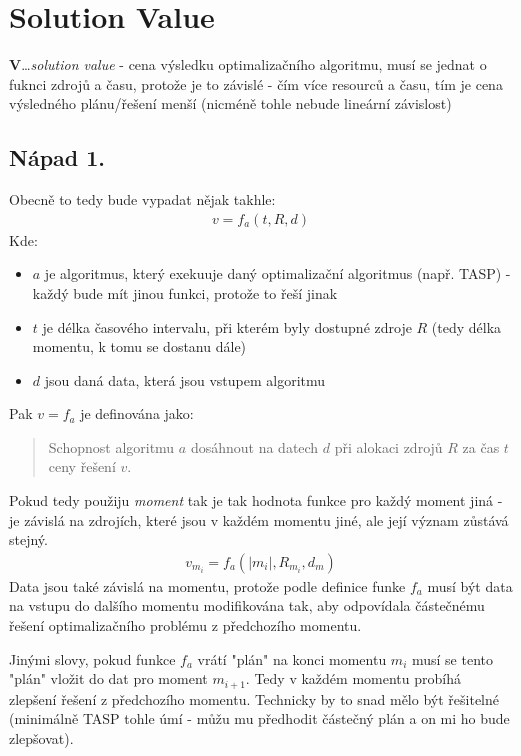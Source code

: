 \documentclass[11pt]{article}
\begin{document}
    \section{Solution Value}\label{sec:solution-value}
    \textbf{V}\ldots\textit{solution value} - cena výsledku optimalizačního algoritmu, musí se jednat o fuknci zdrojů a času,
    protože je to závislé - čím více resourců a času, tím je cena výsledného plánu/řešení menší (nicméně tohle nebude lineární závislost)\\
    \subsection{Nápad 1.}\label{subsec:napad-1}
    Obecně to tedy bude vypadat nějak takhle:
    \begin{align*}
        v = f_{a}(t, R, d)
    \end{align*}
    Kde:
    \begin{itemize}
        \item $a$ je algoritmus, který exekuuje daný optimalizační algoritmus (např. TASP) - každý bude mít jinou funkci, protože to řeší jinak
        \item $t$ je délka časového intervalu, při kterém byly dostupné zdroje $R$ (tedy délka momentu, k tomu se dostanu dále)
        \item $d$ jsou daná data, která jsou vstupem algoritmu
    \end{itemize}
    Pak $v = f_{a}$ je definována jako:
    \begin{quotation}
        Schopnost algoritmu $a$ dosáhnout na datech $d$ při alokaci zdrojů $R$ za čas $t$ ceny řešení $v$.
    \end{quotation}
    Pokud tedy použiju \textit{moment} tak je tak hodnota funkce pro každý moment jiná - je závislá na zdrojích, které jsou v každém momentu jiné,
    ale její význam zůstává stejný.
    \begin{align*}
        v_{m_{i}} = f_{a}(|m_{i}|, R_{m_{i}}, d_{m})
    \end{align*}
    Data jsou také závislá na momentu, protože podle definice funke $f_{a}$ musí být data na vstupu do dalšího momentu modifikována tak,
    aby odpovídala částečnému řešení optimalizačního problému z předchozího momentu.

    Jinými slovy, pokud funkce $f_a$ vrátí "plán" na konci momentu $m_i$ musí se tento "plán" vložit do dat pro moment $m_{i+1}$.
    Tedy v každém momentu probíhá zlepšení řešení z předchozího momentu.
    Technicky by to snad mělo být řešitelné (minimálně TASP tohle úmí - můžu mu předhodit částečný plán a on mi ho bude zlepšovat).
\end{document}
